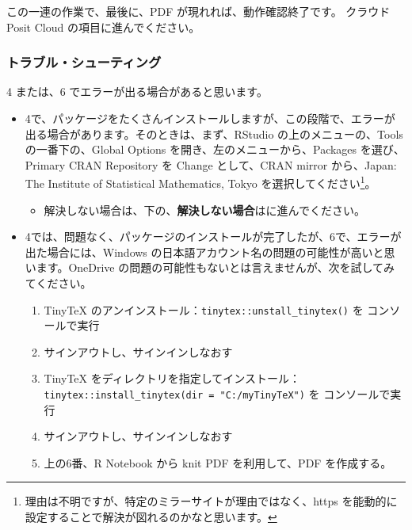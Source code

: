 \documentclass[
]{bxjsbook}
\providecommand{\tightlist}{%
  \setlength{\itemsep}{0pt}\setlength{\parskip}{0pt}}
\theoremstyle{definition}
\theoremstyle{definition}
\theoremstyle{definition}
\theoremstyle{definition}
\theoremstyle{remark}
\begin{document}
この一連の作業で、最後に、PDF が現れれば、動作確認終了です。
クラウド Posit Cloud の項目に進んでください。

\hypertarget{ux30c8ux30e9ux30d6ux30ebux30b7ux30e5ux30fcux30c6ux30a3ux30f3ux30b0}{%
\subsubsection{トラブル・シューティング}\label{ux30c8ux30e9ux30d6ux30ebux30b7ux30e5ux30fcux30c6ux30a3ux30f3ux30b0}}

4 または、6 でエラーが出る場合があると思います。

\begin{itemize}
\item
  4で、パッケージをたくさんインストールしますが、この段階で、エラーが出る場合があります。そのときは、まず、RStudio の上のメニューの、Tools の一番下の、Global Options を開き、左のメニューから、Packages を選び、Primary CRAN Repository を Change として、CRAN mirror から、Japan: The Institute of Statistical Mathematics, Tokyo を選択してください\footnote{理由は不明ですが、特定のミラーサイトが理由ではなく、https を能動的に設定することで解決が図れるのかなと思います。}。

  \begin{itemize}
  \tightlist
  \item
    解決しない場合は、下の、\textbf{解決しない場合}はに進んでください。
  \end{itemize}
\item
  4では、問題なく、パッケージのインストールが完了したが、6で、エラーが出た場合には、Windows の日本語アカウント名の問題の可能性が高いと思います。OneDrive の問題の可能性もないとは言えませんが、次を試してみてください。

  \begin{enumerate}
  \def\labelenumi{\arabic{enumi}.}
  \tightlist
  \item
    TinyTeX のアンインストール：\texttt{tinytex::unstall\_tinytex()} を コンソールで実行
  \item
    サインアウトし、サインインしなおす
  \item
    TinyTeX をディレクトリを指定してインストール：\texttt{tinytex::install\_tinytex(dir\ =\ "C:/myTinyTeX")} を コンソールで実行
  \item
    サインアウトし、サインインしなおす
  \item
    上の6番、R Notebook から knit PDF を利用して、PDF を作成する。
  \end{enumerate}


\end{itemize}
\end{document}
